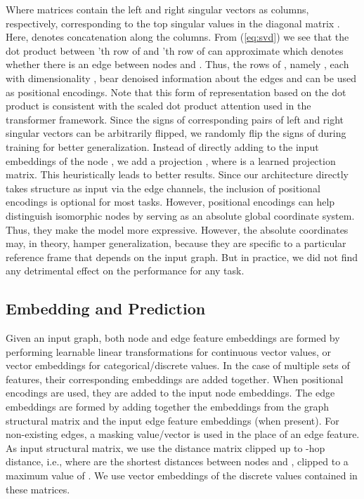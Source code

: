 \documentclass[sigconf,authorversion]{acmart}
\begin{document}
Where  matrices contain the  left and right singular vectors as columns, respectively, corresponding to the top  singular values in the diagonal matrix . Here,  denotes concatenation along the columns. From (\ref{eq:svd}) we see that the dot product between 'th row of  and 'th row of  can approximate  which denotes whether there is an edge between nodes  and . Thus, the rows of , namely , each with dimensionality , bear denoised information about the edges and can be used as positional encodings. Note that this form of representation based on the dot product is consistent with the scaled dot product attention used in the transformer framework. Since the signs of corresponding pairs of left and right singular vectors can be arbitrarily flipped, we randomly flip the signs of  during training for better generalization. Instead of directly adding  to the input embeddings of the node , we add a projection , where  is a learned projection matrix. This heuristically leads to better results. Since our architecture directly takes structure as input via the edge channels, the inclusion of positional encodings is optional for most tasks. However, positional encodings can help distinguish isomorphic nodes \citep{zhang2020revisiting} by serving as an absolute global coordinate system. Thus, they make the model more expressive. However, the absolute coordinates may, in theory, hamper generalization, because they are specific to a particular reference frame that depends on the input graph. But in practice, we did not find any detrimental effect on the performance for any task.

\subsection{Embedding and Prediction}
Given an input graph, both node and edge feature embeddings are formed by performing learnable linear transformations for continuous vector values, or vector embeddings for categorical/discrete values. In the case of multiple sets of features, their corresponding embeddings are added together. When positional encodings  are used, they are added to the input node embeddings. The edge embeddings are formed by adding together the embeddings from the graph structural matrix and the input edge feature embeddings (when present). For non-existing edges, a masking value/vector is used in the place of an edge feature. As input structural matrix, we use the distance matrix clipped up to -hop distance, i.e.,  where  are the shortest distances between nodes  and , clipped to a maximum value of . We use vector embeddings of the discrete values contained in these matrices.
\end{document}
